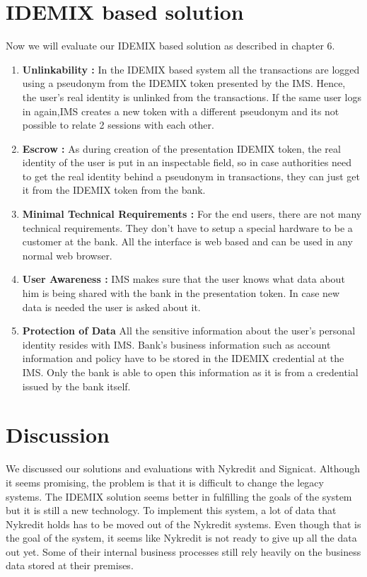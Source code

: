 \section{IDEMIX based solution}
Now we will evaluate our IDEMIX based solution as described in chapter 6. 
\begin{enumerate}
	\item{\textbf{Unlinkability :}}
	In the IDEMIX based system all the transactions are logged using a pseudonym from the IDEMIX token presented by the IMS. Hence, the user's real identity is unlinked from the transactions. If the same user logs in again,IMS creates a new token with a different pseudonym and its not possible to relate 2 sessions with each other.
	\item{\textbf{Escrow :}}
	As during creation of the presentation IDEMIX token, the real identity of the user is put in an inspectable field, so in case authorities need to get the real identity behind a pseudonym in transactions, they can just get it from the IDEMIX token from the bank.
	\item{\textbf{Minimal Technical Requirements :}}
	For the end users, there are not many technical requirements. They don't have to setup a special hardware to be a customer at the bank. All the interface is web based and can be used in any normal web browser. 
	\item{\textbf{User Awareness :}}
	IMS makes sure that the user knows what data about him is being shared with the bank in the presentation token. In case new data is needed the user is asked about it.
	\item{\textbf{Protection of Data}}
	All the sensitive information about the user's personal identity resides with IMS. Bank's business information such as account information and policy have to be stored in the IDEMIX credential at the  IMS. Only the bank is able to open this information as it is from a credential issued by the bank itself.
\end{enumerate}
\section{Discussion}
We discussed our solutions and evaluations with Nykredit and Signicat. Although it seems promising, the problem is that it is difficult to change the legacy systems. The IDEMIX solution seems better in fulfilling the goals of the system but it is still a new technology. To implement this system, a lot of data that Nykredit holds has to be moved out of the Nykredit systems. Even though that is the goal of the system, it seems like Nykredit is not ready to give up all the data out yet. Some of their internal business processes still rely heavily on the business data stored at their premises. 

